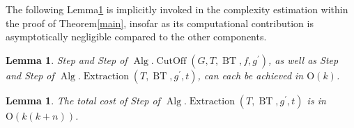 \documentclass[letter,11pt]{article}
\newtheorem{la}[thm]{Lemma}
\theoremstyle{definition}
\theoremstyle{definition}
\DeclareMathOperator{\BT}{BT}
\DeclareMathOperator{\col}{col}
\DeclareMathOperator{\Alg}{Alg}
\DeclareMathOperator{\Cen}{Centroid}
\DeclareMathOperator{\Joi}{Joint}
\DeclareMathOperator{\JoiV}{JointVertex}
\DeclareMathOperator{\CutOff}{CutOff}
\DeclareMathOperator{\Extraction}{Extraction}
\newcommand{\1}{\boldmath$~1~$\unboldmath}
\newcommand{\Ord}{\mathrm{O}}
\newcommand{\tume}{\hspace*{0.2em}}
\newcommand{\maru}[1]{{\ooalign{\hfill$\small#1$\hfill\crcr\scalebox{1.3}{$\bigcirc$}}}}
\begin{document}

The following Lemma\tume\ref{subtrees-containing-v} is implicitly invoked in the complexity estimation 
within the proof of Theorem\tume\ref{main}, insofar as its computational contribution is asymptotically 
negligible compared to the other components.
\begin{la}\label{subtrees-containing-v}
Step\tume\maru{\ref{hige}} and Step\tume\maru{\ref{del-t}} of $\Alg.\CutOff(G,T,\BT,f,g^{\prime})$, as well as Step\tume\maru{\ref{hige2}} and Step\tume\maru{\ref{del-ell}} of 
$\Alg.\Extraction(T, \BT,g^{\prime},t)$, can each be achieved in $\Ord(k)$. 
\end{la}

\begin{la}\label{mini-jyunbi}
The total cost of Step\tume\maru{\ref{mini-puzzle}} of $\Alg.\Extraction(T,\BT,g^{\prime},t)$ is in $\Ord(k(k+n))$.  
\end{la}
\end{document}

